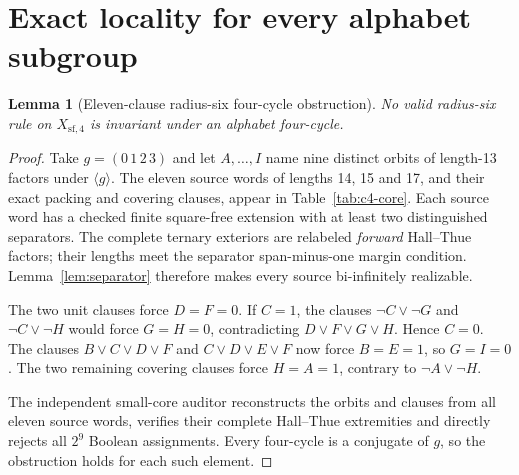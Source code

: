 \documentclass[11pt]{article}
\newtheorem{lemma}[theorem]{Lemma}
\theoremstyle{remark}
\newcommand{\Xsf}{X_{\mathrm{sf},4}}
\begin{document}
\section{Exact locality for every alphabet subgroup}
\label{sec:exact-radii}

\begin{lemma}[Eleven-clause radius-six four-cycle obstruction]
\label{lem:new-c4-r6}
No valid radius-six rule on $\Xsf$ is invariant
under an alphabet four-cycle.
\end{lemma}
\begin{proof}
Take $g=(0\,1\,2\,3)$ and let $A,\dots,I$ name
nine distinct orbits of length-13 factors under
$\langle g\rangle$. The eleven source words of lengths
14, 15 and 17, and their exact packing and covering
clauses, appear in Table~\ref{tab:c4-core}.
Each source word has a checked finite square-free
extension with at least two distinguished separators.
The complete ternary exteriors are relabeled
\emph{forward} Hall--Thue factors; their lengths
meet the separator span-minus-one margin condition.
Lemma~\ref{lem:separator} therefore makes every
source bi-infinitely realizable.

The two unit clauses force $D=F=0$.
If $C=1$, the clauses
$\neg C\vee\neg G$ and $\neg C\vee\neg H$
would force $G=H=0$, contradicting
$D\vee F\vee G\vee H$. Hence $C=0$.
The clauses $B\vee C\vee D\vee F$
and $C\vee D\vee E\vee F$ now force
$B=E=1$, so $G=I=0$. The two remaining
covering clauses force $H=A=1$, contrary to
$\neg A\vee\neg H$.

The independent small-core auditor reconstructs
the orbits and clauses from all eleven source
words, verifies their complete Hall--Thue
extremities and directly rejects all $2^9$
Boolean assignments. Every four-cycle is a
conjugate of $g$, so the obstruction holds
for each such element.
\end{proof}
\end{document}
